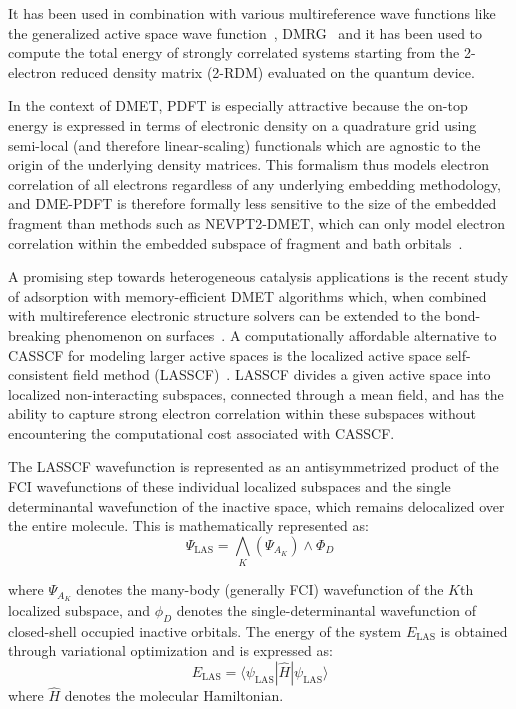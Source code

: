 It has been used in combination with various multireference wave functions like the generalized active space wave function~\cite{Ghosh2017}, DMRG~\cite{Sharma2019, Sharma2020} and it has been used to compute the total energy of strongly correlated systems starting from the 2-electron reduced density matrix (2-RDM) evaluated on the quantum device.

In the context of DMET, PDFT is especially attractive because the on-top energy is expressed in terms of electronic density on a quadrature grid using semi-local (and therefore linear-scaling) functionals which are agnostic to the origin of the underlying density matrices. This formalism thus models electron correlation of all electrons regardless of any underlying embedding methodology, and DME-PDFT is therefore formally less sensitive to the size of the embedded fragment than methods such as NEVPT2-DMET, which can only model electron correlation within the embedded subspace of fragment and bath orbitals~\cite{Mitra2023}.

A promising step towards heterogeneous catalysis applications is the recent study of adsorption with memory-efficient DMET algorithms which, when combined with multireference electronic structure solvers can be extended to the bond-breaking phenomenon on surfaces~\cite{Mitra2022}.
A computationally affordable alternative to CASSCF for modeling larger active spaces is the localized active space self-consistent field method (LASSCF)~\cite{Hermes2019, Hermes2020}.
LASSCF divides a given active space into localized non-interacting subspaces, connected through a mean field, and has the ability to capture strong electron correlation within these subspaces without encountering the computational cost associated with CASSCF.

The LASSCF wavefunction is represented as an antisymmetrized product of the FCI wavefunctions of these individual localized subspaces and the single determinantal wavefunction of the inactive space, which remains delocalized over the entire molecule.
This is mathematically represented as:
\begin{equation}
\Psi_{\text{LAS}} = \bigwedge_{K} (\Psi_{A_K}) \wedge \Phi_D
\end{equation}

where \( \Psi_{A_K} \) denotes the many-body (generally FCI) wavefunction of the \( K \)th localized subspace, and \( \phi_D \) denotes the single-determinantal wavefunction of closed-shell occupied inactive orbitals.
The energy of the system \( E_{\text{LAS}} \) is obtained through variational optimization and is expressed as:
\begin{equation}
    E_{\text{LAS}} = \langle \psi_{\text{LAS}} | \hat{H} | \psi_{\text{LAS}} \rangle
\end{equation}
where \( \hat{H} \) denotes the molecular Hamiltonian.

